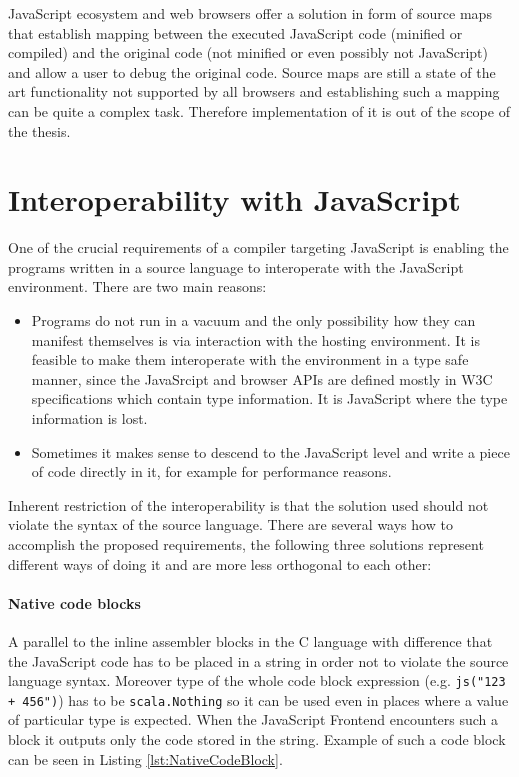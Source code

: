 \documentclass[12pt,a4paper]{report}
\begin{document}
JavaScript ecosystem and web browsers offer a solution in form of source maps \cite{SourceMaps} that establish mapping between the executed JavaScript code (minified or compiled) and the original code (not minified or even possibly not JavaScript) and allow a user to debug the original code. Source maps are still a state of the art functionality not supported by all browsers and establishing such a mapping can be quite a complex task. Therefore implementation of it is out of the scope of the thesis.

\section{Interoperability with JavaScript}

One of the crucial requirements of a compiler targeting JavaScript is enabling the programs written in a source language to interoperate with the JavaScript environment. There are two main reasons:

\begin{itemize} 
\item Programs do not run in a vacuum and the only possibility how they can manifest themselves is via interaction with the hosting environment. It is feasible to make them interoperate with the environment in a type safe manner, since the JavaSrcipt and browser APIs are defined mostly in W3C \cite{W3c} specifications which contain type information. It is JavaScript where the type information is lost. 
\item Sometimes it makes sense to descend to the JavaScript level and write a piece of code directly in it, for example for performance reasons. 
\end{itemize}

Inherent restriction of the interoperability is that the solution used should not violate the syntax of the source language. There are several ways how to accomplish the proposed requirements, the following three solutions represent different ways of doing it and are more less orthogonal to each other: 

\paragraph{Native code blocks} A parallel to the inline assembler blocks in the C language with difference that the JavaScript code has to be placed in a string in order not to violate the source language syntax. Moreover type of the whole code block expression (e.g. \texttt{js("123 + 456")}) has to be \texttt{scala.Nothing} so it can be used even in places where a value of particular type is expected. When the JavaScript Frontend encounters such a block it outputs only the code stored in the string. Example of such a code block can be seen in Listing \ref{lst:NativeCodeBlock}.
\end{document}
